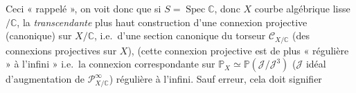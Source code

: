 \documentclass[11pt,a4paper]{article}
\begin{document}
Ceci « rappelé », on voit donc que si $S = \operatorname{Spec}\mathbb{C}$, donc $X$ courbe algébrique lisse$/\mathbb{C}$,  la \struck{\ill{}}  \emph{transcendante} \struck{\ill{}}  plus haut   construction d'une connexion projective (canonique) sur $X/\mathbb{C}$, i.e.\ d'une section canonique du torseur $\mathcal{C}_{X/\mathbb{C}}$ (des connexions projectives sur $X$),   (cette connexion projective est de plus « régulière » à l'infini » i.e.\ la connexion correspondante sur $\mathbb{P}_X \simeq \mathbb{P}(\mathcal{J}/\mathcal{J}^{3})$ ($\mathcal{J}$ idéal d'augmentation de $\mathcal{P}^{\infty}_{X/\mathbb{C}}$)   régulière à l'infini. Sauf erreur, cela doit signifier

\end{document}
